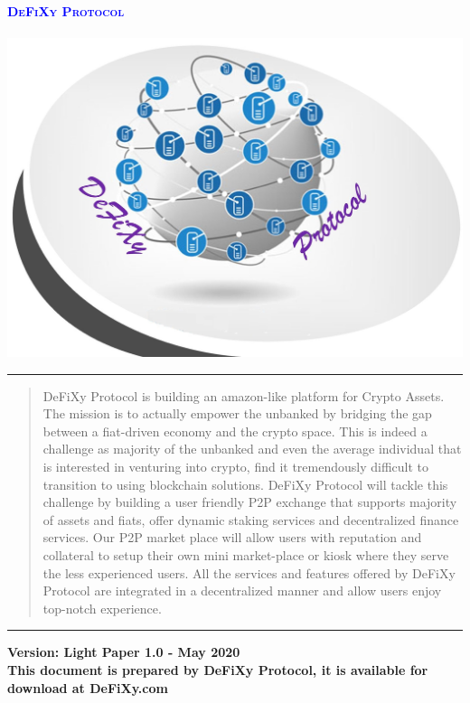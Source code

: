 \documentclass[12pt,onecolumn,letterpaper]{article} %
\begin{document}

\begin{titlepage}
\begin{center}

\hfill
\textcolor{blue}{\textbf{\textsc{\Huge DeFiXy Protocol }}}\\
\hfill
{}\\[1.8cm]
\includegraphics[width=0.5\linewidth]{logo.JPG}
\\[1.8cm]
\hfill
\noindent\rule[0.5ex]{\linewidth}{1pt}
\begin{abstract}
 DeFiXy Protocol is building an amazon-like platform for Crypto Assets. The mission is to actually empower the unbanked by bridging the gap between a fiat-driven economy and the crypto space. This is  indeed a challenge as majority of the unbanked and even the average individual that is interested in venturing into crypto, find it tremendously difficult to transition to using blockchain solutions. DeFiXy Protocol will tackle this challenge by building a user friendly P2P exchange that supports majority of assets and fiats, offer dynamic staking services and decentralized finance services. Our P2P market place will allow users with reputation and collateral to setup their own mini market-place or kiosk where they serve the less experienced users. All the services and features offered by DeFiXy Protocol are integrated in a decentralized manner and allow users enjoy top-notch experience.
 \end{abstract}
\noindent\rule[0.5ex]{\linewidth}{1pt}
\end{center}
\textbf{\small Version: Light Paper 1.0 - May 2020}\\
\textbf{\small This document is prepared by DeFiXy Protocol, it is available for download at DeFiXy.com }
\end{titlepage}
\end{document}
